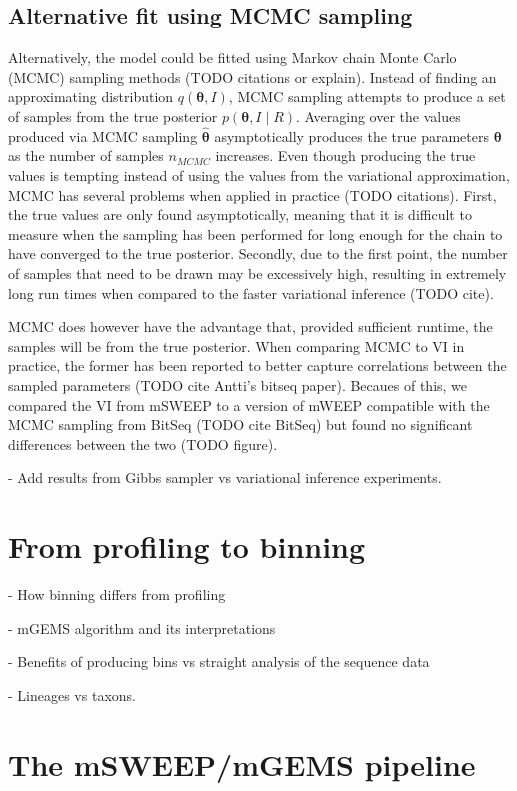 \documentclass[officiallayout]{tktla}
\begin{document}
\subsection{Alternative fit using MCMC sampling}
Alternatively, the model could be fitted using Markov chain Monte
Carlo (MCMC) sampling methods (TODO citations or explain). Instead of
finding an approximating distribution $q\left(\boldsymbol\theta,
I\right)$, MCMC sampling attempts to produce a set of samples from the
true posterior $p\left(\boldsymbol\theta, I\middle|
R\right)$. Averaging over the values produced via MCMC sampling
$\hat{\boldsymbol\theta}$ asymptotically produces the true parameters
$\boldsymbol\theta$ as the number of samples $n_{MCMC}$
increases. Even though producing the true values is tempting instead
of using the values from the variational approximation, MCMC has
several problems when applied in practice (TODO citations). First, the
true values are only found asymptotically, meaning that it is
difficult to measure when the sampling has been performed for long
enough for the chain to have converged to the true
posterior. Secondly, due to the first point, the number of samples
that need to be drawn may be excessively high, resulting in extremely
long run times when compared to the faster variational inference (TODO
cite).

MCMC does however have the advantage that, provided sufficient
runtime, the samples will be from the true posterior. When comparing
MCMC to VI in practice, the former has been reported to better capture
correlations between the sampled parameters (TODO cite Antti's bitseq
paper). Becaues of this, we compared the VI from mSWEEP to a version
of mWEEP compatible with the MCMC sampling from BitSeq (TODO cite
BitSeq) but found no significant differences between the two (TODO figure).

- Add results from Gibbs sampler vs variational inference experiments.

\section{From profiling to binning}

- How binning differs from profiling

- mGEMS algorithm and its interpretations

- Benefits of producing bins vs straight analysis of the sequence data

- Lineages vs taxons.

\section{The mSWEEP/mGEMS pipeline}
\end{document}
